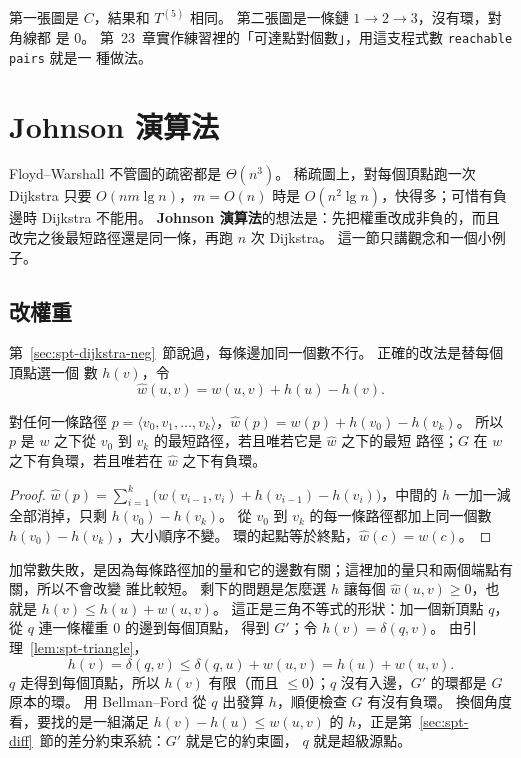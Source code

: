 第一張圖是 $C$，結果和 $T^{(5)}$ 相同。 第二張圖是一條鏈 $1 \to 2 \to 3$，沒有環，對角線都
是 $0$。 第~23~章實作練習裡的「可達點對個數」，用這支程式數 \texttt{reachable pairs} 就是一
種做法。

\section{Johnson 演算法}
\label{sec:spt-johnson}

Floyd--Warshall 不管圖的疏密都是 $\Theta(n^3)$。 稀疏圖上，對每個頂點跑一次 Dijkstra 只要
$O(nm \lg n)$，$m = O(n)$ 時是 $O(n^2 \lg n)$，快得多；可惜有負邊時 Dijkstra 不能用。
\textbf{Johnson 演算法}的想法是：先把權重改成非負的，而且改完之後最短路徑還是同一條，再跑
$n$ 次 Dijkstra。 這一節只講觀念和一個小例子。

\subsection{改權重}

第~\ref{sec:spt-dijkstra-neg}~節說過，每條邊加同一個數不行。 正確的改法是替每個頂點選一個
數 $h(v)$，令
\[
\hat{w}(u, v) = w(u, v) + h(u) - h(v).
\]

\begin{lemma}
\label{lem:spt-reweight}
對任何一條路徑 $p = \langle v_0, v_1, \ldots, v_k \rangle$，$\hat{w}(p) = w(p) + h(v_0) -
h(v_k)$。 所以 $p$ 是 $w$ 之下從 $v_0$ 到 $v_k$ 的最短路徑，若且唯若它是 $\hat{w}$ 之下的最短
路徑；$G$ 在 $w$ 之下有負環，若且唯若在 $\hat{w}$ 之下有負環。
\end{lemma}

\begin{proof}
$\hat{w}(p) = \sum_{i=1}^{k} \bigl( w(v_{i-1}, v_i) + h(v_{i-1}) - h(v_i) \bigr)$，中間的 $h$
一加一減全部消掉，只剩 $h(v_0) - h(v_k)$。 從 $v_0$ 到 $v_k$ 的每一條路徑都加上同一個數
$h(v_0) - h(v_k)$，大小順序不變。 環的起點等於終點，$\hat{w}(c) = w(c)$。
\end{proof}

加常數失敗，是因為每條路徑加的量和它的邊數有關；這裡加的量只和兩個端點有關，所以不會改變
誰比較短。 剩下的問題是怎麼選 $h$ 讓每個 $\hat{w}(u, v) \ge 0$，也就是 $h(v) \le h(u) +
w(u, v)$。 這正是三角不等式的形狀：加一個新頂點 $q$，從 $q$ 連一條權重 $0$ 的邊到每個頂點，
得到 $G'$；令 $h(v) = \delta(q, v)$。 由引理~\ref{lem:spt-triangle}，
\[
h(v) = \delta(q, v) \le \delta(q, u) + w(u, v) = h(u) + w(u, v).
\]
$q$ 走得到每個頂點，所以 $h(v)$ 有限（而且 $\le 0$）；$q$ 沒有入邊，$G'$ 的環都是 $G$ 原本的環。
用 Bellman--Ford 從 $q$ 出發算 $h$，順便檢查 $G$ 有沒有負環。 換個角度看，要找的是一組滿足
$h(v) - h(u) \le w(u, v)$ 的 $h$，正是第~\ref{sec:spt-diff}~節的差分約束系統：$G'$ 就是它的約束圖，
$q$ 就是超級源點。

